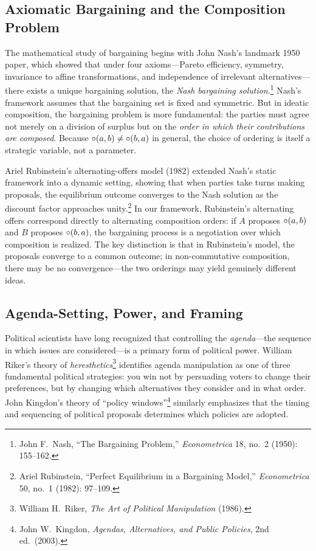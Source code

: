\subsection{Axiomatic Bargaining and the Composition Problem}

The mathematical study of bargaining begins with John Nash's landmark
1950 paper, which showed that under four axioms---Pareto efficiency,
symmetry, invariance to affine transformations, and independence of
irrelevant alternatives---there exists a unique bargaining solution, the
\emph{Nash bargaining solution}.\footnote{John F.\ Nash, ``The Bargaining
Problem,'' \textit{Econometrica} 18, no.\ 2 (1950): 155--162.}  Nash's
framework assumes that the bargaining set is fixed and symmetric.  But in
ideatic composition, the bargaining problem is more fundamental: the parties
must agree not merely on a division of surplus but on the \emph{order in
which their contributions are composed}.  Because $\circ(a,b) \neq
\circ(b,a)$ in general, the choice of ordering is itself a strategic
variable, not a parameter.

Ariel Rubinstein's alternating-offers model (1982) extended Nash's static
framework into a dynamic setting, showing that when parties take turns
making proposals, the equilibrium outcome converges to the Nash solution as
the discount factor approaches unity.\footnote{Ariel Rubinstein, ``Perfect
Equilibrium in a Bargaining Model,'' \textit{Econometrica} 50, no.\ 1
(1982): 97--109.}  In our framework, Rubinstein's alternating offers
correspond directly to alternating composition orders: if $A$ proposes
$\circ(a,b)$ and $B$ proposes $\circ(b,a)$, the bargaining process is
a negotiation over which composition is realized.  The key distinction is
that in Rubinstein's model, the proposals converge to a common outcome; in
non-commutative composition, there may be no convergence---the two orderings
may yield genuinely different ideas.

\subsection{Agenda-Setting, Power, and Framing}

Political scientists have long recognized that controlling the
\emph{agenda}---the sequence in which issues are considered---is a primary
form of political power.  William Riker's theory of
\emph{heresthetics}\footnote{William H.\ Riker, \textit{The Art of
Political Manipulation} (1986).} identifies agenda manipulation as one of
three fundamental political strategies: you win not by persuading voters
to change their preferences, but by changing which alternatives they
consider and in what order.  John Kingdon's theory of ``policy
windows''\footnote{John W.\ Kingdon, \textit{Agendas, Alternatives, and
Public Policies}, 2nd ed.\ (2003).} similarly emphasizes that the timing
and sequencing of political proposals determines which policies are adopted.

